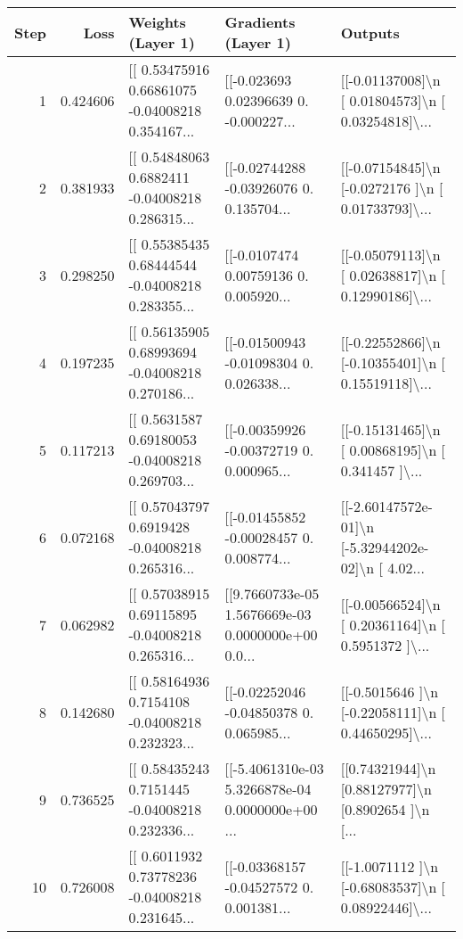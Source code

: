 \begin{tabular}{rrlll}
\toprule
 Step &     Loss &                                  Weights (Layer 1) &                                Gradients (Layer 1) &                                            Outputs \\
\midrule
    1 & 0.424606 & [[ 0.53475916  0.66861075 -0.04008218  0.354167... & [[-0.023693    0.02396639  0.         -0.000227... & [[-0.01137008]\textbackslash n [ 0.01804573]\textbackslash n [ 0.03254818]\textbackslash ... \\
    2 & 0.381933 & [[ 0.54848063  0.6882411  -0.04008218  0.286315... & [[-0.02744288 -0.03926076  0.          0.135704... & [[-0.07154845]\textbackslash n [-0.0272176 ]\textbackslash n [ 0.01733793]\textbackslash ... \\
    3 & 0.298250 & [[ 0.55385435  0.68444544 -0.04008218  0.283355... & [[-0.0107474   0.00759136  0.          0.005920... & [[-0.05079113]\textbackslash n [ 0.02638817]\textbackslash n [ 0.12990186]\textbackslash ... \\
    4 & 0.197235 & [[ 0.56135905  0.68993694 -0.04008218  0.270186... & [[-0.01500943 -0.01098304  0.          0.026338... & [[-0.22552866]\textbackslash n [-0.10355401]\textbackslash n [ 0.15519118]\textbackslash ... \\
    5 & 0.117213 & [[ 0.5631587   0.69180053 -0.04008218  0.269703... & [[-0.00359926 -0.00372719  0.          0.000965... & [[-0.15131465]\textbackslash n [ 0.00868195]\textbackslash n [ 0.341457  ]\textbackslash ... \\
    6 & 0.072168 & [[ 0.57043797  0.6919428  -0.04008218  0.265316... & [[-0.01455852 -0.00028457  0.          0.008774... & [[-2.60147572e-01]\textbackslash n [-5.32944202e-02]\textbackslash n [ 4.02... \\
    7 & 0.062982 & [[ 0.57038915  0.69115895 -0.04008218  0.265316... & [[9.7660733e-05 1.5676669e-03 0.0000000e+00 0.0... & [[-0.00566524]\textbackslash n [ 0.20361164]\textbackslash n [ 0.5951372 ]\textbackslash ... \\
    8 & 0.142680 & [[ 0.58164936  0.7154108  -0.04008218  0.232323... & [[-0.02252046 -0.04850378  0.          0.065985... & [[-0.5015646 ]\textbackslash n [-0.22058111]\textbackslash n [ 0.44650295]\textbackslash ... \\
    9 & 0.736525 & [[ 0.58435243  0.7151445  -0.04008218  0.232336... & [[-5.4061310e-03  5.3266878e-04  0.0000000e+00 ... & [[0.74321944]\textbackslash n [0.88127977]\textbackslash n [0.8902654 ]\textbackslash n [... \\
   10 & 0.726008 & [[ 0.6011932   0.73778236 -0.04008218  0.231645... & [[-0.03368157 -0.04527572  0.          0.001381... & [[-1.0071112 ]\textbackslash n [-0.68083537]\textbackslash n [ 0.08922446]\textbackslash ... \\
\bottomrule
\end{tabular}
